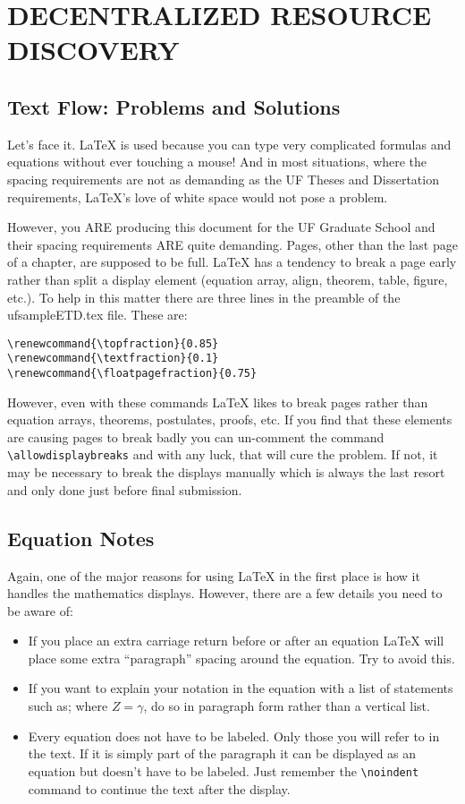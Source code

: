 \chapter{DECENTRALIZED RESOURCE DISCOVERY}
\section{Text Flow: Problems and Solutions}
Let's face it. LaTeX is used because you can type very complicated formulas and equations without ever touching a mouse! And in most situations, where the spacing requirements are not as demanding as the UF Theses and Dissertation requirements, LaTeX's  love of white space would not pose a problem.

However, you ARE producing this document for the UF Graduate School and their spacing requirements ARE quite demanding. Pages, other than the last page of a chapter, are supposed to be full. LaTeX has a tendency to break a page early rather than split a display element (equation array, align, theorem, table, figure, etc.). To help in this matter there are three lines in the preamble of the ufsampleETD.tex file. These are:
\begin{verbatim}
\renewcommand{\topfraction}{0.85}
\renewcommand{\textfraction}{0.1}
\renewcommand{\floatpagefraction}{0.75}
\end{verbatim}

However, even with these commands LaTeX likes to break pages rather than equation arrays, theorems, postulates, proofs, etc. If you find that these elements are causing pages to break badly you can un-comment the command \verb=\allowdisplaybreaks= and with any luck, that will cure the problem. If not, it may be necessary to break the displays manually which is always the last resort and only done just before final submission.
\section{Equation Notes}
Again, one of the major reasons for using LaTeX in the first place is how it handles the mathematics displays. However, there are a few details you need to be aware of:
\begin{itemize}

    \item If you place an extra carriage return before or after an equation LaTeX will place some extra ``paragraph'' spacing around the equation. Try to avoid this.
    \item If you want to explain your notation in the equation with a list of statements such as; where $Z = \gamma$, do so in paragraph form rather than a vertical list.
    \item  Every equation does not have to be labeled. Only those you will refer to in the text. If it is simply part of the paragraph it can be displayed as an equation but doesn't have to be labeled. Just remember the \verb=\noindent = command to continue the text after the display.

\end{itemize}

